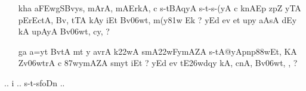 \def\DevnagVersion{2.15}\documentclass{article}
\begin{document}
\begin{itemize}
\begin{itemize}
               \item[\dn kha] {\dn a\3FEwgSBvys, mArA, mAErkA, c s\2-tBAqyA s\2-t{\rs -\re}s\2-(yA c k\?nAEp zp\?Z yTA pErEctA, Bv\?, tTA kAy\0 iEt Bv\306wt, m(y\381w\? Ek {\rs ?\re} yEd ev et up\?y aAsA dEy\2 kA upAyA Bv\306wt, cy\?, {\rs ?\re}}
               
               \item[\dn ga] {\dn a=y\?t BvtA\2 mt y avrA k\322wA smA\322wFymAZA s\2-tA@yApnp\388wEt, KA Zv\306wtrA c \387wymAZA sm\5y\?t iEt {\rs ?\re} yEd ev tE\326wdqy\? kA, cnA, Bv\306wt, \0, {\rs ?\re}}
 
                \end{itemize}      
                                                                
\end{itemize}

\begin{center}
{\dn .. i .. s\2-t{\rs -\re}s\2foDn ..}
\end{center}
\end{document}
